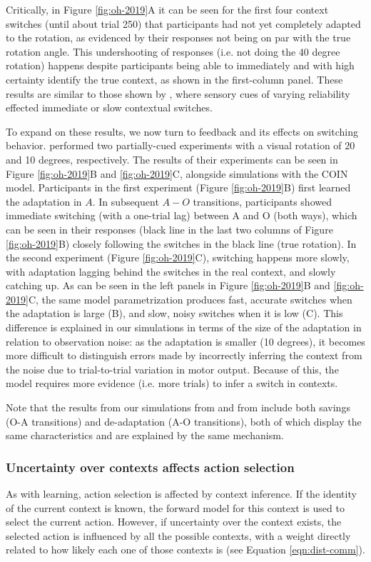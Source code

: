 \documentclass[a4paper,doc,floatsintext,natbib]{apa6}
\def \fref #1{Figure \ref{#1}}     %
\def \eref #1{Equation \ref{#1}}   %
\begin{document}
Critically, in \fref{fig:oh-2019}A it can be seen for the first four context switches (until about trial 250) that participants had not yet completely adapted to the rotation, as evidenced by their responses not being on par with the true rotation angle. This undershooting of responses (i.e. not doing the 40 degree rotation) happens despite participants being able to immediately and with high certainty identify the true context, as shown in the first-column panel. These results are similar to those shown by \cite{Imamizu_Explicit_2007}, where sensory cues of varying reliability effected immediate or slow contextual switches.

To expand on these results, we now turn to feedback and its effects on switching behavior. \cite{Oh_Minimizing_2019} performed two partially-cued experiments with a visual rotation of 20 and 10 degrees, respectively. The results of their experiments can be seen in \fref{fig:oh-2019}B and \ref{fig:oh-2019}C, alongside simulations with the COIN model. Participants in the first experiment (\fref{fig:oh-2019}B) first learned the adaptation in $A$. In subsequent $A - O$ transitions, participants showed immediate switching (with a one-trial lag) between A and O (both ways), which can be seen in their responses (black line in the last two columns of \fref{fig:oh-2019}B) closely following the switches in the black line (true rotation). In the second experiment (\fref{fig:oh-2019}C), switching happens more slowly, with adaptation lagging behind the switches in the real context, and slowly catching up. As can be seen in the left panels in \fref{fig:oh-2019}B and \ref{fig:oh-2019}C, the same model parametrization produces fast, accurate switches when the adaptation is large (B), and slow, noisy switches when it is low (C). This difference is explained in our simulations in terms of the size of the adaptation in relation to observation noise: as the adaptation is smaller (10 degrees), it becomes more difficult to distinguish errors made by incorrectly inferring the context from the noise due to trial-to-trial variation in motor output. Because of this, the model requires more evidence (i.e. more trials) to infer a switch in contexts.

Note that the results from our simulations from \cite{Oh_Minimizing_2019} and from \cite{Kim_Neural_2015} include both savings (O-A transitions) and de-adaptation (A-O transitions), both of which display the same characteristics and are explained by the same mechanism.

\subsubsection{Uncertainty over contexts affects action selection}
As with learning, action selection is affected by context inference. If the identity of the current context is known, the forward model for this context is used to select the current action. However, if uncertainty over the context exists, the selected action is influenced by all the possible contexts, with a weight directly related to how likely each one of those contexts is (see \eref{eqn:dist-comm}).
\end{document}
